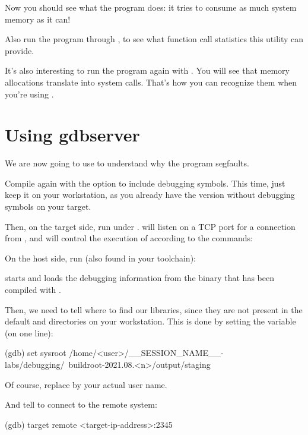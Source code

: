Now you should see what the program does: it tries to consume as much
system memory as it can!

Also run the program through , to see what function call
statistics this utility can provide.

It's also interesting to run the program again with . You
will see that memory allocations translate into  system
calls. That's how you can recognize them when you're using
.

\section{Using gdbserver}

We are now going to use  to understand why the program
segfaults.

Compile  again with the  option to
include debugging symbols. This time, just keep it on your workstation,
as you already have the version without debugging symbols on your target.

Then, on the target side, run  under
.  will listen on a TCP port for a
connection from , and will control the execution of
 according to the  commands:


On the host side, run  (also found in your toolchain):

 starts and loads the debugging information from the
 binary that has been compiled with .

Then, we need to tell where to find our libraries, since they are not
present in the default  and  directories on
your workstation. This is done by setting the  
variable (on one line):

\begin{bashinput}
(gdb) set sysroot /home/<user>/__SESSION_NAME__-labs/debugging/\
    buildroot-2021.08.<n>/output/staging
\end{bashinput}

Of course, replace  by your actual user name.

And tell  to connect to the remote system:
\begin{bashinput}
(gdb) target remote <target-ip-address>:2345
\end{bashinput}

